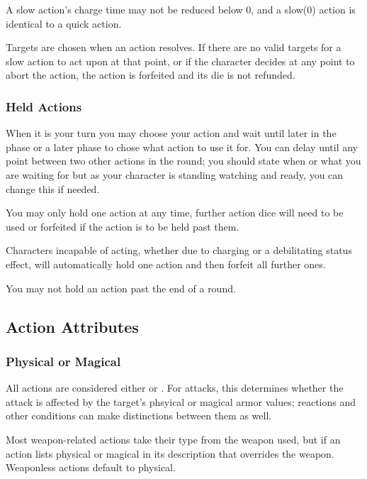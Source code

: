 \begin{multicols}{2}
            A slow action's charge time may not be reduced below 0, and a slow(0) action is identical to a quick action.

            Targets are chosen when an action resolves. If there are no valid targets for a slow action to act upon at that point, or if the character decides at any point to abort the action, the action is forfeited and its die is not refunded.

        \subsubsection{Held Actions}
            When it is your turn you may choose  your action and wait until later in the phase or a later phase to chose what action to use it for. You can delay until any point between two other actions in the round; you should state when or what you are waiting for  but as your character is standing watching and ready, you can change this if needed.

            You may only hold one action at any time, further action dice will need to be used or forfeited if the action is to be held past them.

            Characters incapable of acting, whether due to charging or a debilitating status effect, will automatically hold one action and then forfeit all further ones.

            You may not hold an action past the end of a round.
                
    \subsection{Action Attributes}
        \subsubsection{Physical or Magical}
            All actions are considered either  or . For attacks, this determines whether the attack is affected by the target's phsyical or magical armor values; reactions and other conditions can make distinctions between them as well.

            Most weapon-related actions take their type from the weapon used, but if an action lists physical or magical in its description that overrides the weapon. Weaponless actions default to physical.
        

\end{multicols}
